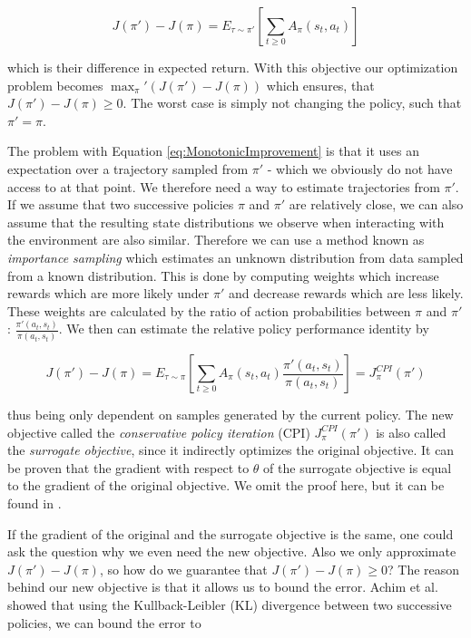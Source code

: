 \begin{equation} \label{eq:MonotonicImprovement}
  J(\pi') - J(\pi) = E_{\tau \sim \pi'}\left[\sum_{t\geq0} A_\pi(s_t, a_t)\right]
\end{equation}

which is their difference in expected return. With this objective our optimization problem becomes $\max_\pi' (J(\pi') - J(\pi))$ which ensures, that $J(\pi') - J(\pi) \geq 0$. The worst case is simply not changing the policy, such that $\pi'=\pi$.

The problem with Equation \ref{eq:MonotonicImprovement} is that it uses an expectation over a trajectory sampled from $\pi'$ - which we obviously do not have access to at that point. We therefore need a way to estimate trajectories from $\pi'$. If we assume that two successive policies $\pi$ and $\pi'$ are relatively close, we can also assume that the resulting state distributions we observe when interacting with the environment are also similar. Therefore we can use a method known as \textit{importance sampling} which estimates an unknown distribution from data sampled from a known distribution. This is done by computing weights which increase rewards which are more likely under $\pi'$ and decrease rewards which are less likely. These weights are calculated by the ratio of action probabilities between $\pi$ and $\pi'$: $\frac{\pi'(a_t, s_t)}{\pi(a_t, s_t)}$. We then can estimate the relative policy performance identity by

\begin{equation}
  J(\pi') - J(\pi) = E_{\tau \sim \pi}\left[\sum_{t\geq0} A_\pi(s_t, a_t) \frac{\pi'(a_t, s_t)}{\pi(a_t, s_t)}\right] = J^{CPI}_\pi(\pi')
\end{equation}

thus being only dependent on samples generated by the current policy. The new objective called the \textit{conservative policy iteration} (CPI) $J^{CPI}_\pi(\pi')$  is also called the \textit{surrogate objective}, since it indirectly optimizes the original objective. It can be proven that the gradient with respect to $\theta$ of the surrogate objective is equal to the gradient of the original objective. We omit the proof here, but it can be found in \cite{foundations2019graesser}. 

If the gradient of the original and the surrogate objective is the same, one could ask the question why we even need the new objective. Also we only approximate $J(\pi') - J(\pi)$, so how do we guarantee that $J(\pi') - J(\pi) \geq 0$? The reason behind our new objective is that it allows us to bound the error. Achim et al. \cite{achiam2017constrained} showed that using the Kullback-Leibler (KL) divergence between two successive policies, we can bound the error to

